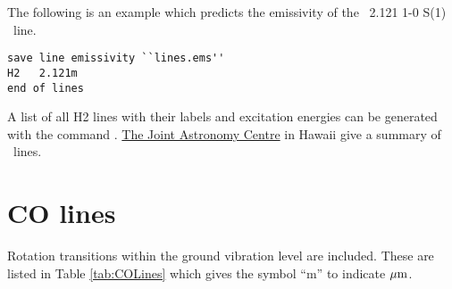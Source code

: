 The following is an example which predicts the emissivity of the \htwo\ 2.121 1-0 S(1) \micron\ line.
\begin{verbatim}
save line emissivity ``lines.ems''
H2   2.121m
end of lines
\end{verbatim}

A list of all H2 lines with their labels and excitation energies can
be generated with the command .
\href{http://jach.hawaii.edu/UKIRT/astronomy/calib/spec\_cal/h2\_s.html}{The Joint Astronomy Centre} in Hawaii give a
summary of \htwo\ lines.

\section{CO lines}

Rotation transitions within the ground vibration level are included.  
These are listed in Table \ref{tab:COLines} which gives the symbol
``m'' to indicate $\hbox{$\mu$m}$.

